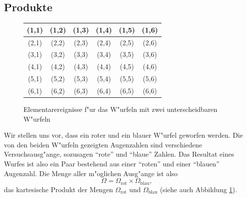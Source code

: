 \subsection{Produkte}
\begin{figure}
\begin{center}
\begin{tabular}{|c|c|c|c|c|c|}
\hline
(1,1)&(1,2)&(1,3)&(1,4)&(1,5)&(1,6)\\
\hline
(2,1)&(2,2)&(2,3)&(2,4)&(2,5)&(2,6)\\
\hline
(3,1)&(3,2)&(3,3)&(3,4)&(3,5)&(3,6)\\
\hline
(4,1)&(4,2)&(4,3)&(4,4)&(4,5)&(4,6)\\
\hline
(5,1)&(5,2)&(5,3)&(5,4)&(5,5)&(5,6)\\
\hline
(6,1)&(6,2)&(6,3)&(6,4)&(6,5)&(6,6)\\
\hline
\end{tabular}
\end{center}
\caption{Elementarereignisse f"ur das W"urfeln mit zwei unterscheidbaren
W"urfeln\label{ereignisse-zwei-wuerfel}}
\end{figure}
Wir stellen uns vor, dass ein roter und ein blauer W"urfel geworfen werden.
Die von den beiden W"urfeln gezeigten Augenzahlen sind verschiedene
Versuchsausg"ange, sozusagen ``rote'' und ``blaue'' Zahlen. Das Resultat
eines Wurfes ist also ein Paar bestehend aus einer ``roten'' und
einer ``blauen'' Augenzahl. Die Menge aller m"oglichen Ausg"ange
ist also 
\[
\Omega = \Omega_{\text{rot}}\times\Omega_{\text{blau}},
\]
das kartesische Produkt der Mengen $\Omega_{\text{rot}}$ und
$\Omega_{\text{blau}}$ (siehe auch Abbildung \ref{ereignisse-zwei-wuerfel}).


